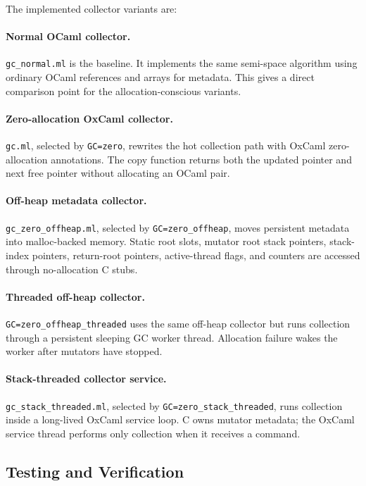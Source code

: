\documentclass[11pt,a4paper]{article}
\begin{document}
The implemented collector variants are:

\paragraph{Normal OCaml collector.}
\texttt{gc\_normal.ml} is the baseline. It implements the same semi-space
algorithm using ordinary OCaml references and arrays for metadata. This gives a
direct comparison point for the allocation-conscious variants.

\paragraph{Zero-allocation OxCaml collector.}
\texttt{gc.ml}, selected by \texttt{GC=zero}, rewrites the hot collection path
with OxCaml zero-allocation annotations. The copy function returns both the
updated pointer and next free pointer without allocating an OCaml pair.

\paragraph{Off-heap metadata collector.}
\texttt{gc\_zero\_offheap.ml}, selected by \texttt{GC=zero\_offheap}, moves
persistent metadata into malloc-backed memory. Static root slots, mutator root
stack pointers, stack-index pointers, return-root pointers, active-thread flags,
and counters are accessed through no-allocation C stubs.

\paragraph{Threaded off-heap collector.}
\texttt{GC=zero\_offheap\_threaded} uses the same off-heap collector but runs
collection through a persistent sleeping GC worker thread. Allocation failure
wakes the worker after mutators have stopped.

\paragraph{Stack-threaded collector service.}
\texttt{gc\_stack\_threaded.ml}, selected by
\texttt{GC=zero\_stack\_threaded}, runs collection inside a long-lived OxCaml
service loop. C owns mutator metadata; the OxCaml service thread performs only
collection when it receives a command.

\subsection{Testing and Verification}
\end{document}
